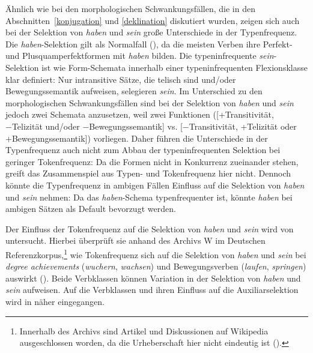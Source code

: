 Ähnlich wie bei den morphologischen Schwankungsfällen, die in den Abschnitten~\ref{konjugation} und \ref{deklination} diskutiert wurden, zeigen sich auch bei der Selektion von \textit{haben} und \textit{sein} große Unterschiede in der Typenfrequenz. Die \textit{haben}-Selektion gilt als Normalfall (\cite[§ 659]{Duden.2016}), da die meisten Verben ihre Perfekt- und Plusquamperfektformen mit \textit{haben} bilden. Die typeninfrequente \textit{sein}-Selektion ist wie Form-Schemata innerhalb einer typeninfrequenten Flexionsklasse klar definiert: Nur intransitive Sätze, die telisch sind und/oder Bewegungssemantik aufweisen, selegieren \textit{sein}. Im Unterschied zu den morphologischen Schwankungsfällen sind bei der Selektion von \textit{haben} und \textit{sein} jedoch zwei Schemata anzusetzen, weil zwei Funktionen ([+Transitivität, −Telizität und/oder −Bewegungssemantik] vs. [−Tran\-si\-ti\-vi\-tät, +Telizität oder +Bewegungssemantik]) vorliegen. Daher führen die Unterschiede in der Typenfrequenz auch nicht zum Abbau der typeninfrequenten Selektion bei geringer Tokenfrequenz: Da die Formen nicht in Konkurrenz zueinander stehen, greift das Zusammenspiel aus Typen- und Tokenfrequenz hier nicht. Dennoch könnte die Typenfrequenz in ambigen Fällen Einfluss auf die Selektion von \textit{haben} und \textit{sein} nehmen: Da das \textit{haben}-Schema typenfrequenter ist, könnte \textit{haben} bei ambigen Sätzen als Default bevorzugt werden. 

Der Einfluss der Tokenfrequenz auf die Selektion von \textit{haben} und \textit{sein} wird von \textcite{Gillmann.2016} untersucht. Hierbei überprüft sie anhand des Archivs W im Deutschen Referenzkorpus,\footnote{Innerhalb des Archivs sind Artikel und Diskussionen auf Wikipedia ausgeschlossen worden, da die Urheberschaft hier nicht eindeutig ist (\cite[245]{Gillmann.2016}).} wie Tokenfrequenz sich auf die Selektion von \textit{haben} und \textit{sein} bei \textit{degree achieve\-ments} (\textit{wuchern}, \textit{wachsen}) und Bewegungsverben (\textit{laufen}, \textit{springen}) auswirkt (\cite[244--252]{Gillmann.2016}). Beide Verbklassen können Variation in der Selektion von \textit{haben} und \textit{sein} aufweisen. Auf die Verbklassen und ihren Einfluss auf die Auxiliarselektion wird in  näher eingegangen. 

